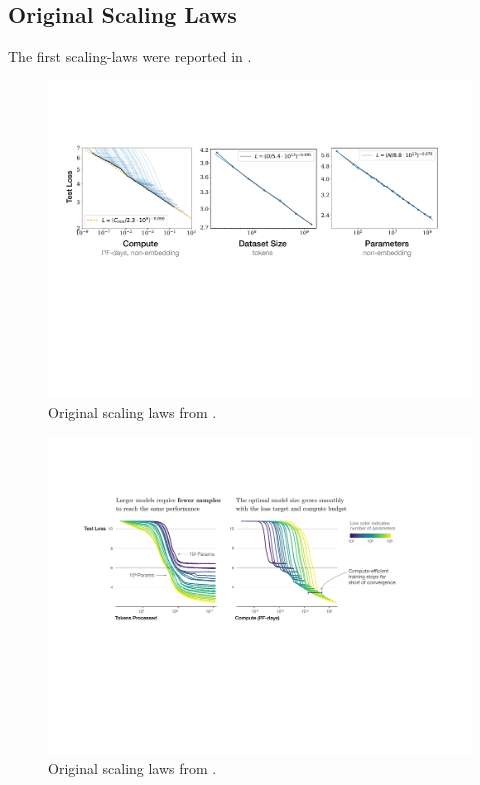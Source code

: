 \documentclass[11pt]{article}
\begin{document}
\subsection{Original Scaling Laws}


The first scaling-laws were reported in \cite{kaplan2020scaling}.

\begin{figure}[ht]
    \centering
    \includegraphics[scale=.5]{figures/SimplePowerLaws.pdf}
    \caption{Original scaling laws from \cite{kaplan2020scaling}.}
    \label{fig_scaling_laws_original_1}
\end{figure}


\begin{figure}[ht]
    \centering
    \includegraphics[scale=.5]{figures/EfficiencyIllustration.pdf}
    \caption{Original scaling laws from \cite{kaplan2020scaling}.}
    \label{fig_scaling_laws_original_2}
\end{figure}
\end{document}
